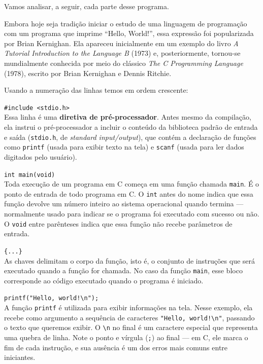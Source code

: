 Vamos analisar, a seguir, cada parte desse programa.

\begin{curiosidade}

Embora hoje seja tradição iniciar o estudo de uma linguagem de programação
com um programa que imprime ``Hello, World!'', essa expressão foi
popularizada por Brian Kernighan. Ela apareceu inicialmente em um exemplo do
livro \textit{A Tutorial Introduction to the Language B} (1973) e,
posteriormente, tornou-se mundialmente conhecida por meio do clássico
\textit{The C Programming Language} (1978), escrito por Brian Kernighan e
Dennis Ritchie.

\end{curiosidade}

Usando a numeração das linhas temos em ordem crescente:

\texttt{\#include <stdio.h>} \\
Essa linha é uma \textbf{diretiva de pré-processador}. Antes mesmo da compilação, ela instrui o pré-processador a incluir o conteúdo da biblioteca padrão de entrada e saída (\texttt{stdio.h}, de \textit{standard input/output}), que contém a declaração de funções como \texttt{printf} (usada para exibir texto na tela) e \texttt{scanf} (usada para ler dados digitados pelo usuário).

\texttt{int main(void)} \\
Toda execução de um programa em C começa em uma função chamada \texttt{main}. É o ponto de entrada de todo programa em C. O \texttt{int} antes do nome indica que essa função devolve um número inteiro ao sistema operacional quando termina — normalmente usado para indicar se o programa foi executado com sucesso ou não. O \texttt{void} entre parênteses indica que essa função não recebe parâmetros de entrada.

\texttt{\{...\}} \\
As chaves delimitam o corpo da função, isto é, o conjunto de instruções que será executado quando a função for chamada. No caso da função \texttt{main}, esse bloco corresponde ao código executado quando o programa é iniciado.

\texttt{printf("Hello, world!\textbackslash n");} \\
A função \texttt{printf} é utilizada para exibir informações na tela. Nesse exemplo, ela recebe como argumento a sequência de caracteres \texttt{"Hello, world!\textbackslash n"}, passando o texto que queremos exibir. O \texttt{\textbackslash n} no final é um caractere especial que representa uma quebra de linha. Note o ponto e vírgula (\texttt{;}) ao final — em C, ele marca o fim de cada instrução, e sua ausência é um dos erros mais comuns entre iniciantes.

